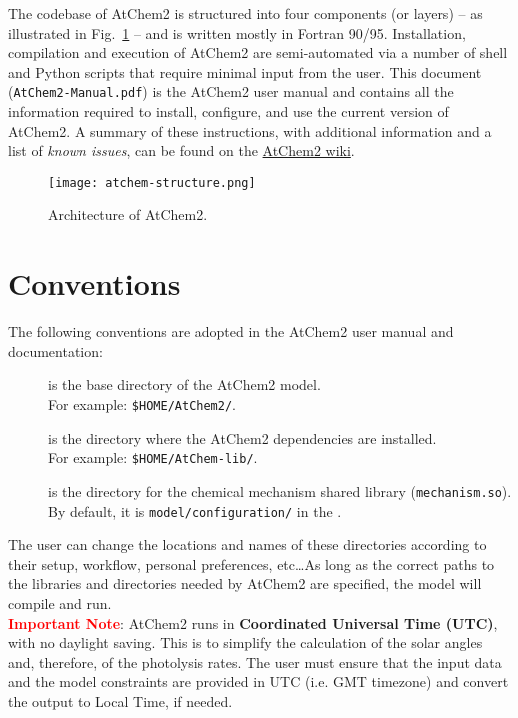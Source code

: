 The codebase of AtChem2 is structured into four components (or layers)
-- as illustrated in Fig.~\ref{fig:atchem-arch} -- and is written
mostly in Fortran 90/95. Installation, compilation and execution of
AtChem2 are semi-automated via a number of shell and Python scripts
that require minimal input from the user. This document
(\texttt{AtChem2-Manual.pdf}) is the AtChem2 user manual and contains
all the information required to install, configure, and use the
current version of AtChem2. A summary of these instructions, with
additional information and a list of \emph{known issues}, can be found
on the \href{https://github.com/AtChem/AtChem2/wiki}{AtChem2 wiki}.

\begin{figure}[htb]
  \centering
  \texttt{[image: atchem-structure.png]}
  \caption{Architecture of AtChem2.}
  \label{fig:atchem-arch}
\end{figure}

\section{Conventions} \label{sec:conventions}

The following conventions are adopted in the AtChem2 user manual and
documentation:

\begin{description}
\item[\maindir] is the base directory of the AtChem2 model.\\
  For example: \texttt{\$HOME/AtChem2/}.
\item[\depdir] is the directory where the AtChem2 dependencies are installed.\\
  For example: \texttt{\$HOME/AtChem-lib/}.
\item[\sharedir] is the directory for the chemical mechanism shared
  library (\texttt{mechanism.so}).\\
  By default, it is \texttt{model/configuration/} in the \maindir.
\end{description}

The user can change the locations and names of these directories
according to their setup, workflow, personal preferences, etc\ldots As
long as the correct paths to the libraries and directories needed by
AtChem2 are specified, the model will compile and run.\\

\textcolor{red}{\bf Important Note}: AtChem2 runs in
\textbf{Coordinated Universal Time (UTC)}, with no daylight
saving. This is to simplify the calculation of the solar angles and,
therefore, of the photolysis rates. The user must ensure that the
input data and the model constraints are provided in UTC (i.e. GMT
timezone) and convert the output to Local Time, if needed.

